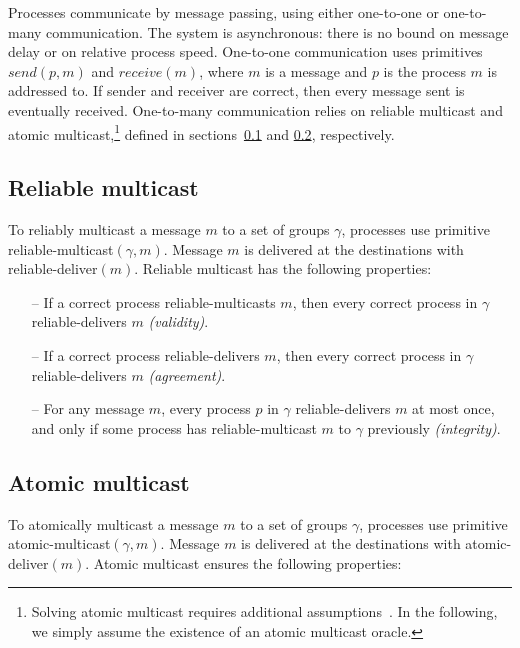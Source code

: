\documentclass[11pt]{article}
\newcommand{\rmcast}{reliable-multicast}
\newcommand{\rmdel}{reliable-deliver}
\newcommand{\amcast}{atomic-multicast}
\newcommand{\amdel}{atomic-deliver}
\begin{document}
Processes communicate by message passing, using either one-to-one or one-to-many communication.
The system is asynchronous: there is no bound on message delay or on relative process speed.
One-to-one communication uses primitives $send(p,m)$ and $receive(m)$, where $m$ is a message and $p$ is the process $m$ is addressed to.
If sender and receiver are correct, then every message sent is eventually received.
%
One-to-many communication relies on reliable multicast and atomic multicast,\footnote{Solving atomic multicast requires additional assumptions~\cite{CT96,FLP85}. In the following, we simply assume the existence of an atomic multicast oracle.}
defined in sections~\ref{sec:rmcast} and \ref{sec:amcast}, respectively.


\subsection{Reliable multicast}
\label{sec:rmcast}

To reliably multicast a message $m$ to a set of groups $\gamma$, processes use primitive \rmcast$(\gamma, m)$.
Message $m$ is delivered at the destinations with \rmdel$(m)$.
Reliable multicast has the following properties:

\begin{itemize}

    \item[--] If a correct process \rmcast{}s $m$, then every correct process in $\gamma$ \rmdel{}s $m$ \emph{(validity)}.

    \item[--] If a correct process \rmdel{}s $m$, then every correct process in $\gamma$ \rmdel{}s $m$ \emph{(agreement)}.

    \item[--] For any message $m$, every process $p$ in $\gamma$ \rmdel{}s $m$ at most once, and only if some process has \rmcast{} $m$  to $\gamma$ previously \emph{(integrity)}.

\end{itemize}

\subsection{Atomic multicast}
\label{sec:amcast}

To atomically multicast a message $m$ to a set of groups $\gamma$, processes use primitive \amcast$(\gamma, m)$.
Message $m$ is delivered at the destinations with \amdel$(m)$.
Atomic multicast ensures the following properties:
\end{document}
